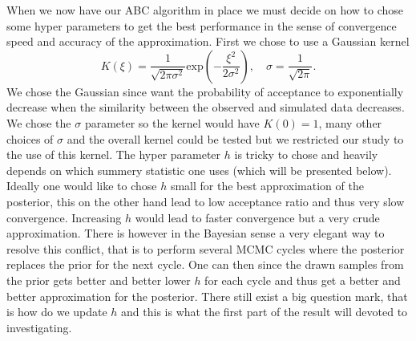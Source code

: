 \documentclass[11pt,a4paper]{article}
\begin{document}
When we now have our ABC algorithm in place we must decide on how to chose some hyper parameters to get the best performance in the sense of convergence speed and accuracy of the approximation. First we chose to use a Gaussian kernel 
\begin{equation*}
    K(\xi) = \frac{1}{\sqrt{2\pi \sigma^2}}\text{exp}\left(-\frac{\xi^2}{2\sigma^2}\right), \quad \sigma = \frac{1}{\sqrt{2\pi}}.
\end{equation*}
We chose the Gaussian since want the probability of acceptance to exponentially decrease when the similarity between the observed and simulated data decreases. We chose the $\sigma$ parameter so the kernel would have $K(0) = 1$, many other choices of $\sigma$ and the overall kernel could be tested but we restricted our study to the use of this kernel. The hyper parameter $h$ is tricky to chose and heavily depends on which summery statistic one uses (which will be presented below). Ideally one would like to chose $h$ small for the best approximation of the posterior, this on the other hand lead to low acceptance ratio and thus very slow convergence. Increasing $h$ would lead to faster convergence but a very crude approximation. There is however in the Bayesian sense a very elegant way to resolve this conflict, that is to perform several MCMC cycles where the posterior replaces the prior for the next cycle. One can then since the drawn samples from the prior gets better and better lower $h$ for each cycle and thus get a better and better approximation for the posterior. There still exist a big question mark, that is how do we update $h$ and this is what the first part of the result will devoted to investigating. 
\end{document}

